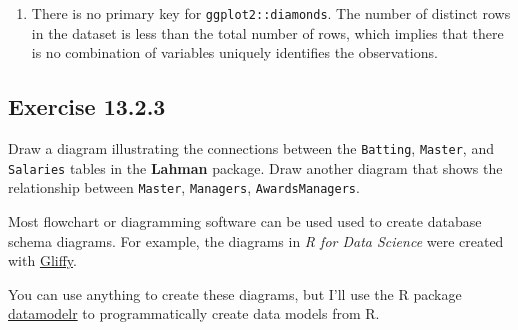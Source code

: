 \documentclass[]{book}
\newenvironment{Shaded}{\begin{snugshade}}{\end{snugshade}}
\newcommand{\CommentTok}[1]{\textcolor[rgb]{0.56,0.35,0.01}{\textit{#1}}}
\newcommand{\DecValTok}[1]{\textcolor[rgb]{0.00,0.00,0.81}{#1}}
\newcommand{\KeywordTok}[1]{\textcolor[rgb]{0.13,0.29,0.53}{\textbf{#1}}}
\newcommand{\NormalTok}[1]{#1}
\newcommand{\OperatorTok}[1]{\textcolor[rgb]{0.81,0.36,0.00}{\textbf{#1}}}
\newcommand{\StringTok}[1]{\textcolor[rgb]{0.31,0.60,0.02}{#1}}
\theoremstyle{plain}
\theoremstyle{remark}
\begin{document}
\begin{enumerate}
\begin{Shaded}
\end{Shaded}
\item
  There is no primary key for \texttt{ggplot2::diamonds}. The number of
  distinct rows in the dataset is less than the total number of rows,
  which implies that there is no combination of variables uniquely
  identifies the observations.

\begin{Shaded}
\end{Shaded}
\end{enumerate}

\hypertarget{exercise-13.2.3}{%
\subsection*{\texorpdfstring{Exercise
{13.2.3}}{Exercise 13.2.3}}\label{exercise-13.2.3}}

Draw a diagram illustrating the connections between the
\texttt{Batting}, \texttt{Master}, and \texttt{Salaries} tables in the
\textbf{Lahman} package. Draw another diagram that shows the
relationship between \texttt{Master}, \texttt{Managers},
\texttt{AwardsManagers}.

Most flowchart or diagramming software can be used used to create
database schema diagrams. For example, the diagrams in \emph{R for Data
Science} were created with \href{https://www.gliffy.com/}{Gliffy}.

You can use anything to create these diagrams, but I'll use the R
package \href{https://github.com/bergant/datamodelr}{datamodelr} to
programmatically create data models from R.
\end{document}
